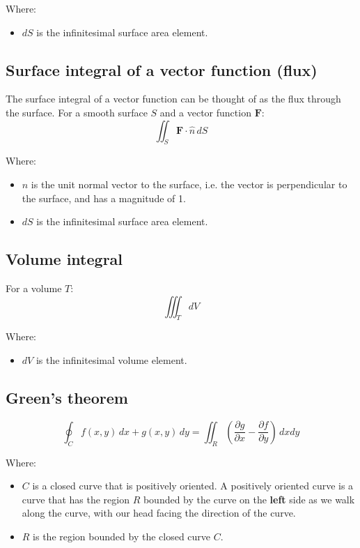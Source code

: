 \documentclass[11pt]{article}
\begin{document}
Where:
\begin{itemize}
\item \(dS\) is the infinitesimal surface area element.
\end{itemize}

\subsection{Surface integral of a vector function (flux)}
\label{sec:org1638eef}
The surface integral of a vector function can be thought of as the flux through the surface.
For a smooth surface \(S\) and a vector function \(\boldsymbol{F}\):
\[\iint_S \boldsymbol{F} \cdot \hat{n} \, dS\]

Where:
\begin{itemize}
\item \(\hat{n}\) is the unit normal vector to the surface, i.e. the vector is perpendicular to the surface, and has a magnitude of 1.
\item \(dS\) is the infinitesimal surface area element.
\end{itemize}

\subsection{Volume integral}
\label{sec:orgbe1152b}
For a volume \(T\):
\[\iiint_T dV\]

Where:
\begin{itemize}
\item \(dV\) is the infinitesimal volume element.
\end{itemize}

 \newpage

\subsection{Green's theorem}
\label{sec:org03a9068}
\[\oint_C f(x, y) \, dx + g (x, y) \, dy = \iint_R \left(\frac{\partial g}{\partial x} - \frac{\partial f}{\partial y} \right) \, dx dy\]

Where:
\begin{itemize}
\item \(C\) is a closed curve that is positively oriented. A positively oriented curve is a curve that has the region \(R\) bounded by the curve on the \textbf{left} side as we walk along the curve, with our head facing the direction of the curve.
\item \(R\) is the region bounded by the closed curve \(C\).
\end{itemize}
\end{document}
